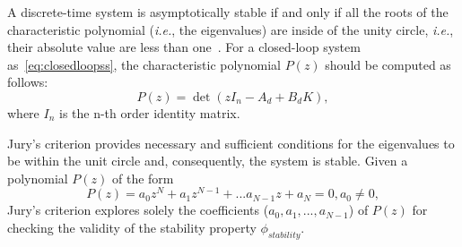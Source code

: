 \documentclass[runningheads,a4paper]{llncs}
\newcommand{\todo}[1]{{\color{red} TODO: #1}}
\begin{document}

A discrete-time system is asymptotically stable if and only if all the roots 
of the characteristic polynomial ({\it i.e.}, the eigenvalues) are inside of 
the unity circle, {\it i.e.}, their absolute value are less than 
one~\cite{astrom1997computer}. For a closed-loop system as~\eqref{eq:closedloopss}, 
the characteristic polynomial $P(z)$ should be computed as follows:
\begin{equation}
P(z)= \det( z I_{n} - A_d + B_d K ),
\end{equation}
where $I_{n}$ is the n-th order identity matrix. 

Jury's criterion provides necessary and sufficient conditions for the eigenvalues 
to be within the unit circle and, consequently, the system is stable.  Given a 
polynomial $P(z)$ of the form
$$
P(z) = a_{0}z^{N} + a_{1}z^{N-1} + ... a_{N-1}z + a_{N} = 0, a_{0}\neq 0,
$$
Jury's criterion explores solely the coefficients ($a_{0},a_{1},...,a_{N-1}$) 
of $P(z)$ for checking the validity of the stability property $\phi_{stability}$. 
\end{document}
